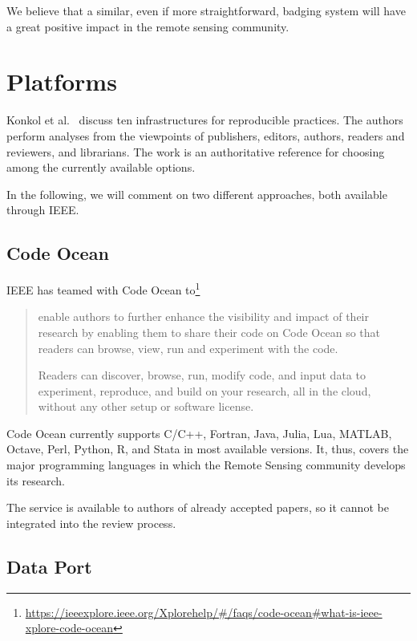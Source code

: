 \documentclass[journal,twoside]{IEEEtran}
\begin{document}
We believe that a similar, even if more straightforward, badging system will have a great positive impact in the remote sensing community.

\section{Platforms}\label{Sec:IEEEPlatforms}

Konkol et al.~\cite{PublishingComputationalResearchaReviewofInfrastructuresforReproducibleandTransparentScholarlyCommunication} discuss ten infrastructures for reproducible practices.
The authors perform analyses from the viewpoints of publishers, editors, authors, readers and reviewers, and librarians.
The work is an authoritative reference for choosing among the currently available options.

In the following, we will comment on two different approaches, both available through IEEE.

\subsection{Code Ocean}

IEEE has teamed with Code Ocean to\footnote{\url{https://ieeexplore.ieee.org/Xplorehelp/#/faqs/code-ocean#what-is-ieee-xplore-code-ocean}}
\begin{quote}
	enable authors to further enhance the visibility and impact of their research by enabling them to share their code on Code Ocean so that readers can browse, view, run and experiment with the code.
	
	Readers can discover, browse, run, modify code, and input data to experiment, reproduce, and build on your research, all in the cloud, without any other setup or software license.
\end{quote}

Code Ocean currently supports 
C/C++, 
Fortran,
Java,
Julia,
Lua,
MATLAB,
Octave,
Perl,
Python,
R, and
Stata in most available versions.
It, thus, covers the major programming languages in which the Remote Sensing community develops its research.

The service is available to authors of already accepted papers, so it cannot be integrated into the review process.

\subsection{Data Port}
\end{document}
